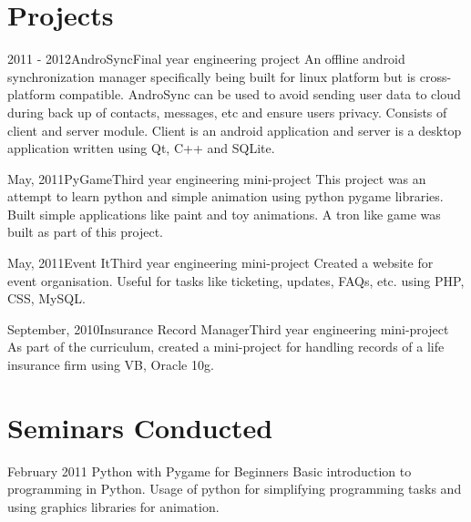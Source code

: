 \documentclass[11pt,a4paper]{moderncv}
\begin{document}
\section{Projects}
\cventry
{2011 - 2012}{AndroSync}{Final year engineering project}{}{}
{An offline android synchronization manager specifically being built for linux platform but is cross-platform compatible. AndroSync can be used to avoid sending user data to cloud during back up of contacts, messages, etc and ensure users privacy. Consists of client and server module. Client is an android application and server is a desktop application written using Qt, C++ and SQLite.}

\cventry
{May, 2011}{PyGame}{Third year engineering mini-project}{}{}
{This project was an attempt to learn python and simple animation using python pygame libraries. Built simple applications like paint and toy 
animations. A tron like game was built as part of this project. }

\cventry
{May, 2011}{Event It}{Third year engineering mini-project}{}{}
{Created a website for event organisation. Useful for tasks like ticketing, updates, FAQs, etc. using PHP, CSS, MySQL. }

\cventry
{September, 2010}{Insurance Record Manager}{Third year engineering mini-project}{}{}
{As part of the curriculum, created a mini-project for handling records of a life insurance firm using VB, Oracle 10g. }

\section{Seminars Conducted}




\cventry
{February 2011}
{Python with Pygame for Beginners}{}{}{}
{Basic introduction to programming in Python. Usage of python for simplifying programming tasks and using graphics libraries for animation.}
\end{document}
